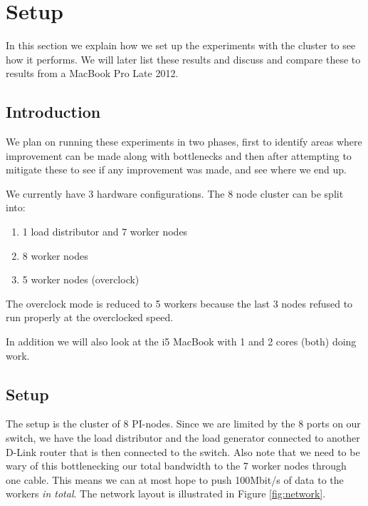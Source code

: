 \clearpage

\section{Setup}
\label{sec:setup}

In this section we explain how we set up the experiments with the cluster to see how it performs. We will later list these results and discuss and compare these to results from a MacBook Pro Late 2012.

\subsection{Introduction}
We plan on running these experiments in two phases, first to identify areas where improvement can be made along with bottlenecks and then after attempting to mitigate these to see if any improvement was made, and see where we end up.

We currently have 3 hardware configurations. The 8 node cluster can be split into:

\begin{enumerate}
\item 1 load distributor and 7 worker nodes
\item 8 worker nodes
\item 5 worker nodes (overclock)
\end{enumerate}

The overclock mode is reduced to 5 workers because the last 3 nodes refused to run properly at the overclocked speed.

In addition we will also look at the i5 MacBook with 1 and 2 cores (both) doing work.

\subsection{Setup}
The setup is the cluster of 8 PI-nodes. Since we are limited by the 8 ports on our switch, we have the load distributor and the load generator connected to another D-Link router that is then connected to the switch.
Also note that we need to be wary of this bottlenecking our total bandwidth to the 7 worker nodes through one cable.
This means we can at most hope to push 100Mbit/s of data to the workers {\em in total}.
The network layout is illustrated in Figure \ref{fig:network}.

